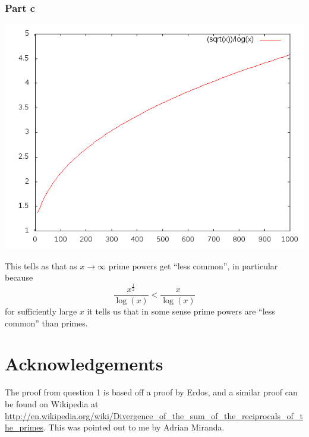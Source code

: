\documentclass{unswmaths}
\begin{document}
\subsubsection*{Part c}
\begin{center}
\includegraphics[scale=0.5]{plot}
\end{center}

This tells as that as $ x \longrightarrow \infty $ prime powers get ``less common'',
in particular because $$ \frac{x^\frac{1}{2}}{\log(x)} < \frac{x}{\log(x)} $$ for sufficiently
large $ x $ it tells us that in some sense prime powers are ``less common'' than primes.

\section*{Acknowledgements}
The proof from question 1 is based off a proof by Erdos, and a similar proof can be found on Wikipedia
at \url{http://en.wikipedia.org/wiki/Divergence_of_the_sum_of_the_reciprocals_of_the_primes}. This was
pointed out to me by Adrian Miranda.
\end{document}
